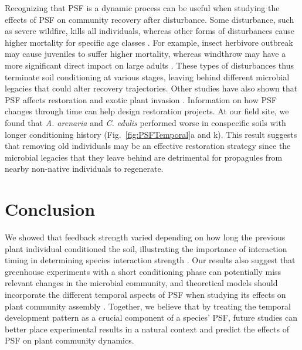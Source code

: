 Recognizing that PSF is a dynamic process can be useful when studying the effects of PSF on community recovery after disturbance. 
Some disturbance, such as severe wildfire, kills all individuals, whereas other forms of disturbances cause higher mortality for specific age classes \citep{Sousa1984}. For example, insect herbivore outbreak may cause juveniles to suffer higher mortality, whereas windthrow may have a more significant direct impact on large adults \citep{Sousa1984}. These types of disturbances thus terminate soil conditioning at various stages, leaving behind different microbial legacies that could alter recovery trajectories. 
Other studies have also shown that PSF affects restoration \citep{Wubs2016} and exotic plant invasion \citep{Suding2013}. Information on how PSF changes through time can help design restoration projects.
At our field site, we found that \textit{A. arenaria} and \textit{C. edulis} performed worse in conspecific soils with longer conditioning history (Fig.~\ref{fig:PSFTemporal}a and k). 
This result suggests that removing old individuals may be an effective restoration strategy since the microbial legacies that they leave behind are detrimental for propagules from nearby non-native individuals to regenerate. 
\par



\section{Conclusion}
We showed that feedback strength varied depending on how long the previous plant individual conditioned the soil, illustrating the importance of interaction timing in determining species interaction strength \citep{Kardol2013Oikos, Peay2018}. 
Our results also suggest that greenhouse experiments with a short conditioning phase can potentially miss relevant changes in the microbial community, and theoretical models should incorporate the different temporal aspects of PSF when studying its effects on plant community assembly \citep{Kardol2013, KeMiki2015}. 
Together, we believe that by treating the temporal development pattern as a crucial component of a species' PSF, future studies can better place experimental results in a natural context and predict the effects of PSF on plant community dynamics.
\par



